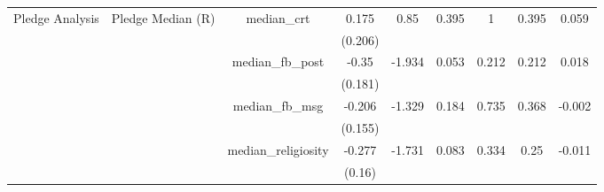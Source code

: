 \begin{tabular}{ccccccccc}
  Pledge Analysis & Pledge Median (R) & median\_crt & 0.175 & 0.85 & 0.395 & 1 & 0.395 & 0.059 \\ 
   &  &  & (0.206) &  &  &  &  &  \\ 
   &  & median\_fb\_post & -0.35 & -1.934 & 0.053 & 0.212 & 0.212 & 0.018 \\ 
   &  &  & (0.181) &  &  &  &  &  \\ 
   &  & median\_fb\_msg & -0.206 & -1.329 & 0.184 & 0.735 & 0.368 & -0.002 \\ 
   &  &  & (0.155) &  &  &  &  &  \\ 
   &  & median\_religiosity & -0.277 & -1.731 & 0.083 & 0.334 & 0.25 & -0.011 \\ 
   &  &  & (0.16) &  &  &  &  &  \\ 
   \hline
\end{tabular}
